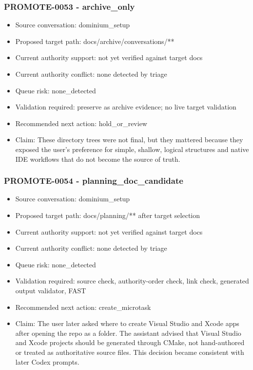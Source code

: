 \documentclass[11pt,a4paper]{report}
\begin{document}
\subsubsection{PROMOTE-0053 - archive\_only}

\begin{itemize}
\item Source conversation: dominium\_setup
\item Proposed target path: docs/archive/conversations/**
\item Current authority support: not yet verified against target docs
\item Current authority conflict: none detected by triage
\item Queue risk: none\_detected
\item Validation required: preserve as archive evidence; no live target validation
\item Recommended next action: hold\_or\_review
\item Claim: These directory trees were not final, but they mattered because they exposed the user's preference for simple, shallow, logical structures and native IDE workflows that do not become the source of truth.
\end{itemize}

\subsubsection{PROMOTE-0054 - planning\_doc\_candidate}

\begin{itemize}
\item Source conversation: dominium\_setup
\item Proposed target path: docs/planning/** after target selection
\item Current authority support: not yet verified against target docs
\item Current authority conflict: none detected by triage
\item Queue risk: none\_detected
\item Validation required: source check, authority-order check, link check, generated output validator, FAST
\item Recommended next action: create\_microtask
\item Claim: The user later asked where to create Visual Studio and Xcode apps after opening the repo as a folder. The assistant advised that Visual Studio and Xcode projects should be generated through CMake, not hand-authored or treated as authoritative source files. This decision became consistent with later Codex prompts.
\end{itemize}
\end{document}
